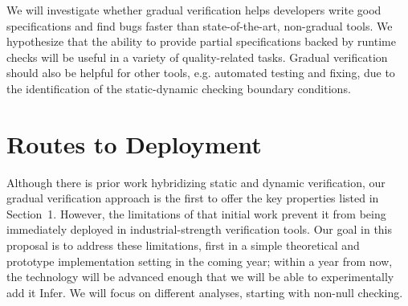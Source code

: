 \documentclass[10pt,twocolumn]{article}
\begin{document}
\begin{sloppypar}
We will investigate whether gradual verification helps developers write good specifications and find bugs faster than state-of-the-art, non-gradual tools.
We hypothesize that the ability to provide partial specifications backed by runtime checks will be useful in a variety of quality-related tasks.
Gradual verification should also be helpful for other tools, e.g. automated testing and fixing, due to the identification of the static-dynamic checking boundary conditions.

\section{Routes to Deployment}
\vspace{-2ex}

Although there is prior work hybridizing static and dynamic verification, 
our gradual verification approach is the first to offer the key properties listed in Section~1. However, the limitations of that initial work prevent it from being immediately deployed in industrial-strength verification tools.  Our goal in this proposal is to address these limitations, first in a simple theoretical and prototype implementation setting in the coming year; within a year from now, the technology will be advanced enough that we will be able to experimentally add it Infer. We will focus on different analyses, starting with non-null checking.


\end{sloppypar}
\end{document}
